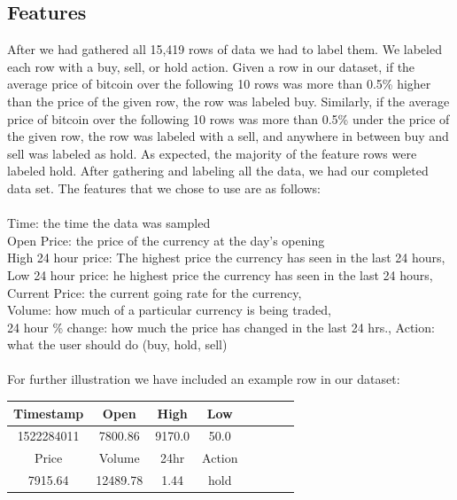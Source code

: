 \documentclass{article}
\begin{document}
\subsection{ Features }
After we had gathered all 15,419 rows of data we had to label them. We labeled each row with a buy, sell, or hold action. Given a row in our dataset, if the average price of bitcoin over the following 10 rows was more than 0.5\% higher than the price of the given row, the row was labeled buy. Similarly, if the average price of bitcoin over the following 10 rows was more than 0.5\% under the price of the given row, the row was labeled with a sell, and anywhere in between buy and sell was labeled as hold. As expected, the majority of the feature rows were labeled hold. After gathering and labeling all the data, we had our completed data set. The features that we chose to use are as follows: \\ \\
Time: the time the data was sampled \\ Open Price: the price of the currency at the day's opening \\ High 24 hour price: The highest price the currency has seen in the last 24 hours, \\ Low 24 hour price: he highest price the currency has seen in the last 24 hours, \\  Current Price: the current going rate for the currency, \\ Volume: how much of a particular currency is being traded, \\ 24 hour \% change: how much the price has changed in the last 24 hrs., Action: what the user should do (buy, hold, sell) \\ \\
For further illustration we have included an example row in our dataset: \\


\begin{center}
  \begin{tabular}{| c | c | c | c | c | c | c | r | }
    \hline
    Timestamp & Open & High & Low \\ \hline
    1522284011 & 7800.86 & 9170.0 & 50.0 \\ \hline
    \hline
    Price & Volume & 24hr & Action  \\ \hline
    7915.64 & 12489.78 & 1.44 & hold   \\ \hline
      \end{tabular}
\end{center}
\end{document}
